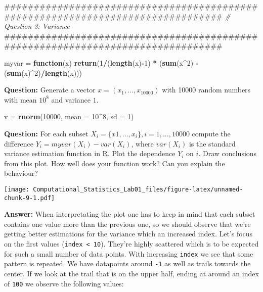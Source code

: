 \documentclass[]{article}
\newenvironment{Shaded}{\begin{snugshade}}{\end{snugshade}}
\newcommand{\KeywordTok}[1]{\textcolor[rgb]{0.13,0.29,0.53}{\textbf{#1}}}
\newcommand{\DataTypeTok}[1]{\textcolor[rgb]{0.13,0.29,0.53}{#1}}
\newcommand{\DecValTok}[1]{\textcolor[rgb]{0.00,0.00,0.81}{#1}}
\newcommand{\StringTok}[1]{\textcolor[rgb]{0.31,0.60,0.02}{#1}}
\newcommand{\CommentTok}[1]{\textcolor[rgb]{0.56,0.35,0.01}{\textit{#1}}}
\newcommand{\ControlFlowTok}[1]{\textcolor[rgb]{0.13,0.29,0.53}{\textbf{#1}}}
\newcommand{\OperatorTok}[1]{\textcolor[rgb]{0.81,0.36,0.00}{\textbf{#1}}}
\newcommand{\NormalTok}[1]{#1}
\begin{document}
\begin{Shaded}
\begin{Highlighting}[]
\NormalTok{################################################################################}
\CommentTok{# Question 3: Variance}
\NormalTok{################################################################################}

\NormalTok{myvar =}\StringTok{ }\ControlFlowTok{function}\NormalTok{(x) }\KeywordTok{return}\NormalTok{(}\DecValTok{1}\OperatorTok{/}\NormalTok{(}\KeywordTok{length}\NormalTok{(x)}\OperatorTok{-}\DecValTok{1}\NormalTok{)  }\OperatorTok{*}\StringTok{ }\NormalTok{(}\KeywordTok{sum}\NormalTok{(x}\OperatorTok{^}\DecValTok{2}\NormalTok{) }\OperatorTok{-}\StringTok{ }\NormalTok{(}\KeywordTok{sum}\NormalTok{(x)}\OperatorTok{^}\DecValTok{2}\NormalTok{)}\OperatorTok{/}\KeywordTok{length}\NormalTok{(x)))}
\end{Highlighting}
\end{Shaded}

\textbf{Question:} Generate a vector \(x = (x_1, ..., x_{10000})\) with
10000 random numbers with mean \(10^8\) and variance \(1\).

\begin{Shaded}
\begin{Highlighting}[]
\NormalTok{v =}\StringTok{ }\KeywordTok{rnorm}\NormalTok{(}\DecValTok{10000}\NormalTok{, }\DataTypeTok{mean =} \DecValTok{10}\OperatorTok{^}\DecValTok{8}\NormalTok{, }\DataTypeTok{sd =} \DecValTok{1}\NormalTok{)}
\end{Highlighting}
\end{Shaded}

\textbf{Question:} For each subset
\(X_i = \{x1,...,x_i \}, i = 1, ..., 10000\) compute the difference
\(Y_i = myvar(X_i)-var(X_i)\), where \(var(X_i)\) is the standard
variance estimation function in R. Plot the dependence \(Y_i\) on \(i\).
Draw conclusions from this plot. How well does your function work? Can
you explain the behaviour?

\texttt{[image: Computational\_Statistics\_Lab01\_files/figure-latex/unnamed-chunk-9-1.pdf]}

\textbf{Answer:} When interpretating the plot one has to keep in mind
that each subset contains one value more than the previous one, so we
should observe that we're getting better estimations for the variance
which an increased index. Let's focus on the first values
(\texttt{index\ \textless{}\ 10}). They're highly scattered which is to
be expected for such a small number of data points. With increasing
\texttt{index} we see that some pattern is repeated. We have datapoints
around \texttt{-1} as well as trails towards the center. If we look at
the trail that is on the upper half, ending at around an index of
\texttt{100} we observe the following values:
\end{document}
